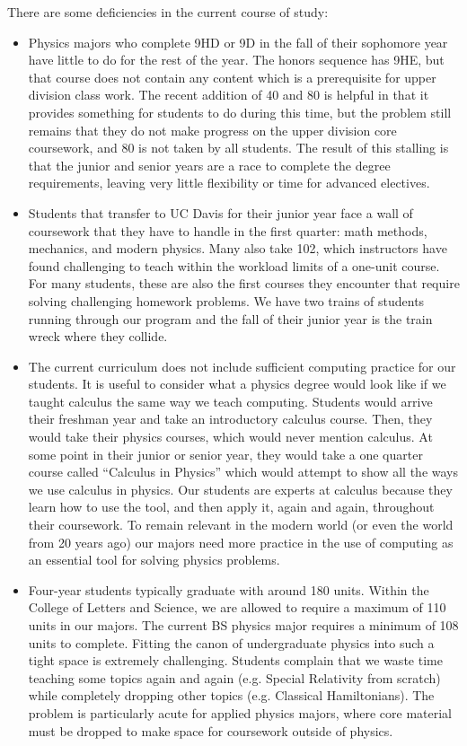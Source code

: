\documentclass[12pt]{article}
\begin{document}
There are some deficiencies in the current course of study:
\begin{itemize}

\item Physics majors who complete 9HD or 9D in the fall of their
  sophomore year have little to do for the rest of the year.  The
  honors sequence has 9HE, but that course does not contain any
  content which is a prerequisite for upper division class work.  The
  recent addition of 40 and 80 is helpful in that it provides
  something for students to do during this time, but the problem still
  remains that they do not make progress on the upper division core
  coursework, and 80 is not taken by all students.  The result of
  this stalling is that the junior and senior years are a race to
  complete the degree requirements, leaving very little flexibility or
  time for advanced electives.

\item Students that transfer to UC Davis for their junior year face a
  wall of coursework that they have to handle in the first quarter:
  math methods, mechanics, and modern physics.  Many also take 102,
  which instructors have found challenging to teach within the
  workload limits of a one-unit course.  For many students, these are
  also the first courses they encounter that require solving
  challenging homework problems.  We have two trains of students
  running through our program and the fall of their junior year is the
  train wreck where they collide.

\item The current curriculum does not include sufficient computing
  practice for our students.  It is useful to consider what a physics
  degree would look like if we taught calculus the same way we teach
  computing.  Students would arrive their freshman year and take an
  introductory calculus course.  Then, they would take their physics
  courses, which would never mention calculus.  At some point in their
  junior or senior year, they would take a one quarter course called
  ``Calculus in Physics'' which would attempt to show all the ways we
  use calculus in physics.  Our students are experts at calculus
  because they learn how to use the tool, and then apply it, again and
  again, throughout their coursework.  To remain relevant in the
  modern world (or even the world from 20 years ago) our majors need
  more practice in the use of computing as an essential tool for
  solving physics problems.

\item Four-year students typically graduate with around 180 units.
  Within the College of Letters and Science, we are allowed to require
  a maximum of 110 units in our majors.  The current BS physics major
  requires a minimum of 108 units to complete.  Fitting the canon of
  undergraduate physics into such a tight space is extremely
  challenging.  Students complain that we waste time teaching some
  topics again and again (e.g. Special Relativity from scratch) while
  completely dropping other topics (e.g. Classical Hamiltonians).  The
  problem is particularly acute for applied physics majors, where core
  material must be dropped to make space for coursework outside of
  physics.


\end{itemize}
\end{document}
